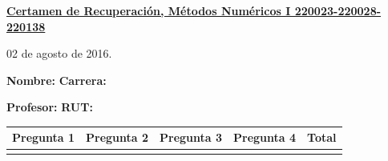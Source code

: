 \documentclass[11pt]{article}
\begin{document}
\hspace*{-1,5cm}

\vspace*{0.5cm} \centerline {\bf\underline{Certamen de Recuperaci\'on, M\'etodos Num\'ericos I 220023-220028-220138 }}
\centerline{\textrm{02 de agosto de 2016.}}  \vspace{0.2cm}


\textbf{Nombre:} \hspace{0.5\textwidth}\textbf{Carrera:}

\vspace{0.1cm}
\textbf{Profesor:}\hspace{0.5\textwidth} \textbf{ RUT:}

\begin{center}
 \begin{tabular}{||p{2cm}|p{2cm}|p{2cm}|p{2cm}||p{2cm}||}
 \hline
 Pregunta 1 &  Pregunta 2 &     Pregunta 3  & Pregunta 4 &Total\\
 \hline

  \vspace{1.5cm} & & & & \\
 \hline
 \end{tabular}
 \end{center}
\end{document}
